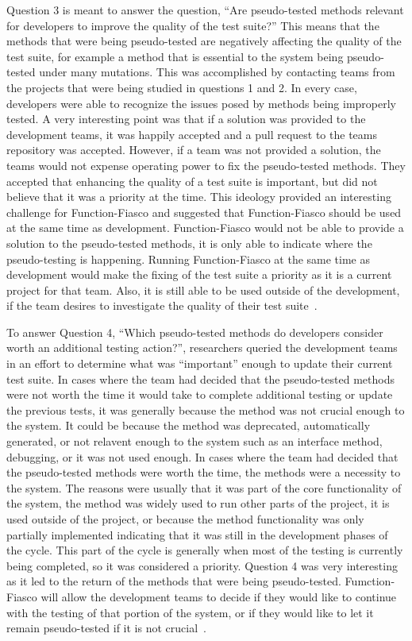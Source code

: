 Question 3 is meant to answer the question, ``Are pseudo-tested methods relevant for developers to improve the quality of the test suite?'' This means that the methods that were being pseudo-tested are negatively affecting the quality of the test suite, for example a method that is essential to the system being pseudo-tested under many mutations. This was accomplished by contacting teams from the projects that were being studied in questions 1 and 2. In every case, developers were able to recognize the issues posed by methods being improperly tested. A very interesting point was that if a solution was provided to the development teams, it was happily accepted and a pull request to the teams repository was accepted. However, if a team was not provided a solution, the teams would not expense operating power to fix the pseudo-tested methods. They accepted that enhancing the quality of a test suite is important, but did not believe that it was a priority at the time. This ideology provided an interesting challenge for Function-Fiasco and suggested that Function-Fiasco should be used at the same time as development. Function-Fiasco would not be able to provide a solution to the pseudo-tested methods, it is only able to indicate where the pseudo-testing is happening. Running Function-Fiasco at the same time as development would make the fixing of the test suite a priority as it is a current project for that team. Also, it is still able to be used outside of the development, if the team desires to investigate the quality of their test suite~\cite{vera2017comprehensive}.

To answer Question 4, ``Which pseudo-tested methods do developers consider worth an additional testing action?'', researchers queried the development teams in an effort to determine what was ``important'' enough to update their current test suite. In cases where the team had decided that the pseudo-tested methods were not worth the time it would take to complete additional testing or update the previous tests, it was generally because the method was not crucial enough to the system. It could be because the method was deprecated, automatically generated, or not relavent enough to the system such as an interface method, debugging, or it was not used enough. In cases where the team had decided that the pseudo-tested methods were worth the time, the methods were a necessity to the system. The reasons were usually that it was part of the core functionality of the system, the method was widely used to run other parts of the project, it is used outside of the project, or because the method functionality was only partially implemented indicating that it was still in the development phases of the cycle. This part of the cycle is generally when most of the testing is currently being completed, so it was considered a priority. Question 4 was very interesting as it led to the return of the methods that were being pseudo-tested. Fumction-Fiasco will allow the development teams to decide if they would like to continue with the testing of that portion of the system, or if they would like to let it remain pseudo-tested if it is not crucial~\cite{vera2017comprehensive}.
%
%
%

